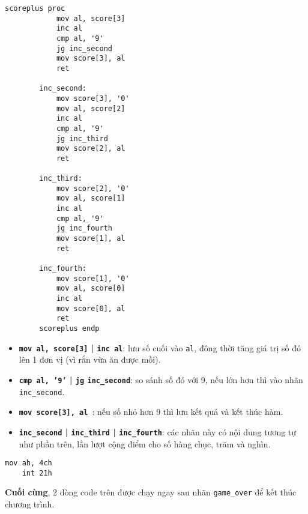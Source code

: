 \begin{itemize}
\begin{itemize}
    \vspace{0.3cm}
    \begin{lstlisting}[style=asm]
        scoreplus proc
            mov al, score[3]             
            inc al                      
            cmp al, '9'                  
            jg inc_second
            mov score[3], al            
            ret
        
        inc_second:
            mov score[3], '0'            
            mov al, score[2]
            inc al
            cmp al, '9'
            jg inc_third
            mov score[2], al
            ret
        
        inc_third:                      
            mov score[2], '0'
            mov al, score[1]
            inc al
            cmp al, '9'
            jg inc_fourth
            mov score[1], al
            ret
        
        inc_fourth:                      
            mov score[1], '0'
            mov al, score[0]
            inc al
            mov score[0], al
            ret  
        scoreplus endp                                                                  
    \end{lstlisting}
    \vspace{0.3cm}
    
    \begin{itemize}
        \itemsep0.2cm
        \item \textbf{\texttt{mov al, score[3]} | \texttt{inc al}}: lưu số cuối vào \texttt{al}, đông thời tăng giá trị số đó lên 1 đơn vị (vì rắn vừa ăn được mồi).
        \item \textbf{\texttt{cmp al, }\texttt{'9'} | \texttt{jg} \texttt{inc\_second}}: so sánh số đó với 9, nếu lớn hơn thì vào nhãn \texttt{inc\_second}.
        \item \textbf{\texttt{mov score[3], al }}: nếu số nhỏ hơn 9 thì lưu kết quả và kết thúc hàm.
        \item \textbf{\texttt{inc\_second} | \texttt{inc\_third} | \texttt{inc\_fourth}}: các nhãn này có nội dung tương tự như phần trên, lần lượt cộng điểm cho số hàng chục, trăm và nghìn.
    \end{itemize}

\vspace{0.5cm}

\begin{lstlisting}[style=asm]
    mov ah, 4ch
    int 21h         
\end{lstlisting}

\vspace{0.5cm}
\noindent \textbf{Cuối cùng}, 2 dòng code trên được chạy ngay sau nhãn \texttt{game\_over} để kết thúc chương trình. 
\end{itemize}
\end{itemize}
